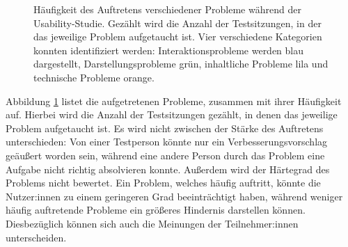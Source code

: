 \begin{figure}[!ht]
  \caption[Häufigkeit des Auftretens verschiedener Usability-Probleme]{Häufigkeit des Auftretens verschiedener Probleme während der Usability-Studie. Gezählt wird die Anzahl der Testsitzungen, in der das jeweilige Problem aufgetaucht ist. Vier verschiedene Kategorien konnten identifiziert werden: Interaktionsprobleme werden blau dargestellt, Darstellungsprobleme grün, inhaltliche Probleme lila und technische Probleme orange.}
  \label{fig:problems}
\end{figure}

Abbildung \ref{fig:problems} listet die aufgetretenen Probleme, zusammen mit ihrer Häufigkeit auf. Hierbei wird die Anzahl der Testsitzungen gezählt, in denen das jeweilige Problem aufgetaucht ist. Es wird nicht zwischen der Stärke des Auftretens unterschieden: Von einer Testperson könnte nur ein Verbesserungsvorschlag geäußert worden sein, während eine andere Person durch das Problem eine Aufgabe nicht richtig absolvieren konnte. Außerdem wird der Härtegrad des Problems nicht bewertet. Ein Problem, welches häufig auftritt, könnte die Nutzer:innen zu einem geringeren Grad beeinträchtigt haben, während weniger häufig auftretende Probleme ein größeres Hindernis darstellen können. Diesbezüglich können sich auch die Meinungen der Teilnehmer:innen unterscheiden.


